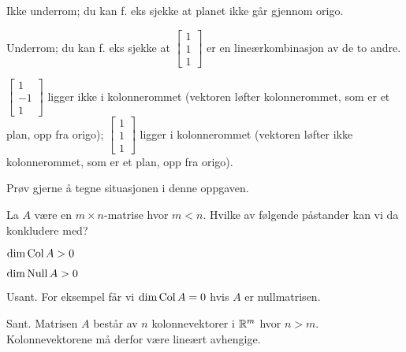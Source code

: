 \begin{losning}

\begin{punkt}
Ikke underrom; du kan f. eks sjekke at planet ikke går gjennom origo.
\end{punkt}

\begin{punkt}
Underrom; du kan f. eks sjekke at $\begin{bmatrix}
1\\
1\\
1
\end{bmatrix}$ er en lineærkombinasjon av de to andre.
\end{punkt}

\begin{punkt}
$\begin{bmatrix}
1\\
-1\\
1
\end{bmatrix}$ ligger ikke i kolonnerommet (vektoren løfter kolonnerommet, som er et plan, opp fra origo); $\begin{bmatrix}
1\\
1\\
1
\end{bmatrix}$ ligger i kolonnerommet (vektoren løfter ikke kolonnerommet, som er et plan, opp fra origo). 

\noindent
Prøv gjerne å tegne situasjonen i denne oppgaven.
\end{punkt}

\end{losning}

\begin{oppgave}
La $A$ være en $m\times n$-matrise hvor $m<n$.
Hvilke av følgende påstander kan vi da konkludere med?
\begin{punkt}
$\dim \operatorname{Col} A > 0$
\end{punkt}

\begin{punkt}
$\dim \operatorname{Null} A > 0$
\end{punkt}

\end{oppgave}

\begin{losning}

\begin{punkt}
Usant.  For eksempel får vi $\dim \operatorname{Col} A = 0$ hvis $A$ er nullmatrisen.
\end{punkt}

\begin{punkt}
Sant. Matrisen $A$ består av $n$ kolonnevektorer i $\mathbb{R}^m$ hvor $n>m$.
Kolonnevektorene må derfor være lineært avhengige.
\end{punkt}

\end{losning}


